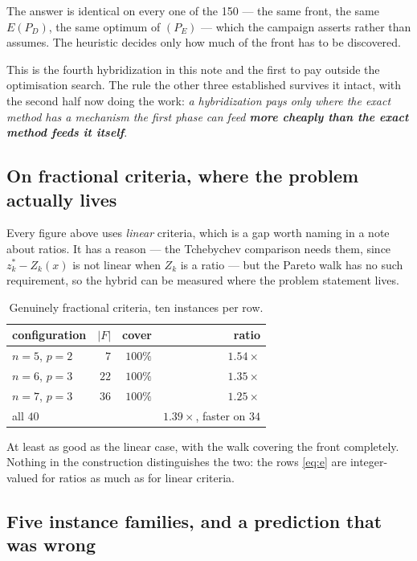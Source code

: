 \documentclass[11pt,a4paper]{article}
\newcommand{\Z}{Z}
\newcommand{\Dset}{D}
\newcommand{\E}{E(P_{\Dset})}
\begin{document}
\noindent
The answer is identical on every one of the 150 --- the same front, the same
$\E$, the same optimum of $(P_E)$ --- which the campaign asserts rather than
assumes.  The heuristic decides only how much of the front has to be
discovered.

This is the fourth hybridization in this note and the first to pay outside the
optimisation search.  The rule the other three established survives it intact,
with the second half now doing the work: \emph{a hybridization pays only where
the exact method has a mechanism the first phase can feed \textbf{more cheaply
than the exact method feeds it itself}}.

\subsection{On fractional criteria, where the problem actually lives}
\label{sec:fracnote}

Every figure above uses \emph{linear} criteria, which is a gap worth naming in
a note about ratios.  It has a reason --- the Tchebychev comparison needs them,
since $z^{*}_k - \Z_k(x)$ is not linear when $\Z_k$ is a ratio --- but the
Pareto walk has no such requirement, so the hybrid can be measured where the
problem statement lives.

\begin{table}[h]
\centering
\caption{Genuinely fractional criteria, ten instances per row.}
\begin{tabular}{lrrr}
\toprule
configuration & $|F|$ & cover & ratio \\
\midrule
$n=5$, $p=2$ & $7$  & $100\%$ & $1.54\times$ \\
$n=6$, $p=3$ & $22$ & $100\%$ & $1.35\times$ \\
$n=7$, $p=3$ & $36$ & $100\%$ & $1.25\times$ \\
\midrule
all $40$ & & & $\mathbf{1.39\times}$, faster on $34$ \\
\bottomrule
\end{tabular}
\end{table}

\noindent
At least as good as the linear case, with the walk covering the front
completely.  Nothing in the construction distinguishes the two: the rows
\eqref{eq:e} are integer-valued for ratios as much as for linear criteria.

\subsection{Five instance families, and a prediction that was wrong}
\label{sec:families}
\end{document}
